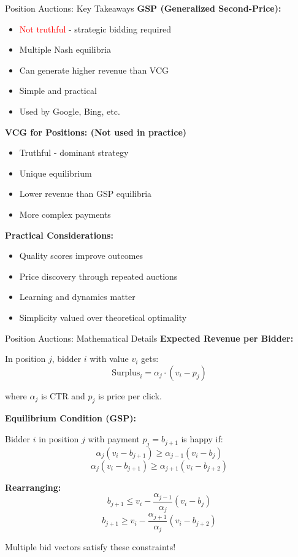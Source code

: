 \documentclass[xcolor={x11names}, aspectratio=169 ]{beamer}
\begin{document}
\begin{frame}{Position Auctions: Key Takeaways}
\textbf{GSP (Generalized Second-Price):}
\begin{itemize}
  \item \textcolor{red}{Not truthful} - strategic bidding required
  \item Multiple Nash equilibria
  \item Can generate higher revenue than VCG
  \item Simple and practical
  \item Used by Google, Bing, etc.
\end{itemize}

\textbf{VCG for Positions: (Not used in practice)}
\begin{itemize}
  \item \textcolor{green!70!black}{Truthful} - dominant strategy
  \item Unique equilibrium
  \item Lower revenue than GSP equilibria
  \item More complex payments
\end{itemize}

\textbf{Practical Considerations:}
\begin{itemize}
  \item Quality scores improve outcomes
  \item Price discovery through repeated auctions
  \item Learning and dynamics matter
  \item Simplicity valued over theoretical optimality
\end{itemize}
\end{frame}

\begin{frame}{Position Auctions: Mathematical Details}
\textbf{Expected Revenue per Bidder:}

In position $j$, bidder $i$ with value $v_i$ gets:
$$\text{Surplus}_i = \alpha_j \cdot (v_i - p_j)$$

where $\alpha_j$ is CTR and $p_j$ is price per click.

\textbf{Equilibrium Condition (GSP):}

Bidder $i$ in position $j$ with payment $p_j = b_{j+1}$ is happy if:
$$\alpha_j(v_i - b_{j+1}) \geq \alpha_{j-1}(v_i - b_j)$$
$$\alpha_j(v_i - b_{j+1}) \geq \alpha_{j+1}(v_i - b_{j+2})$$

\textbf{Rearranging:}
$$b_{j+1} \leq v_i - \frac{\alpha_{j-1}}{\alpha_j}(v_i - b_j)$$
$$b_{j+1} \geq v_i - \frac{\alpha_{j+1}}{\alpha_j}(v_i - b_{j+2})$$

Multiple bid vectors satisfy these constraints!
\end{frame}
\end{document}
